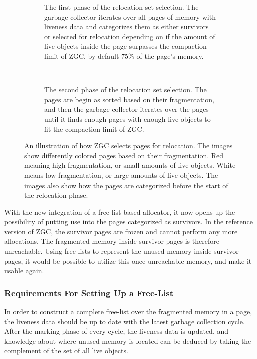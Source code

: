 \begin{figure}[H]
    \centering
    \begin{subfigure}[b]{0.6\textwidth}
        \centering
        
        \caption{The first phase of the relocation set selection. The garbage collector iterates over all pages of memory with liveness data and categorizes them as either survivors or selected for relocation depending on if the amount of live objects inside the page surpasses the compaction limit of ZGC, by default 75\% of the page's memory.}
        \label{fig:rel_set_selector1}
    \end{subfigure}
    \\
    \begin{subfigure}[b]{0.6\textwidth}
        \centering
        
        \caption{The second phase of the relocation set selection. The pages are begin as sorted based on their fragmentation, and then the garbage collector iterates over the pages until it finds enough pages with enough live objects to fit the compaction limit of ZGC.}
        \label{fig:rel_set_selector2}
    \end{subfigure}
    \caption{An illustration of how ZGC selects pages for relocation. The images show differently colored pages based on their fragmentation. Red meaning high fragmentation, or small amounts of live objects. White means low fragmentation, or large amounts of live objects. The images also show how the pages are categorized before the start of the relocation phase.}
    \label{fig:rel_set_selector}
\end{figure} 

With the new integration of a free list based allocator, it now opens up the possibility of putting use into the pages categorized as survivors. In the reference version of ZGC, the survivor pages are frozen and cannot perform any more allocations. The fragmented memory inside survivor pages is therefore unreachable. Using free-lists to represent the unused memory inside survivor pages, it would be possible to utilize this once unreachable memory, and make it usable again.

\subsubsection{Requirements For Setting Up a Free-List}
\label{sec:analyse-init}
In order to construct a complete free-list over the fragmented memory in a page, the liveness data should be up to date with the latest garbage collection cycle. After the marking phase of every cycle, the liveness data is updated, and knowledge about where unused memory is located can be deduced by taking the complement of the set of all live objects.

